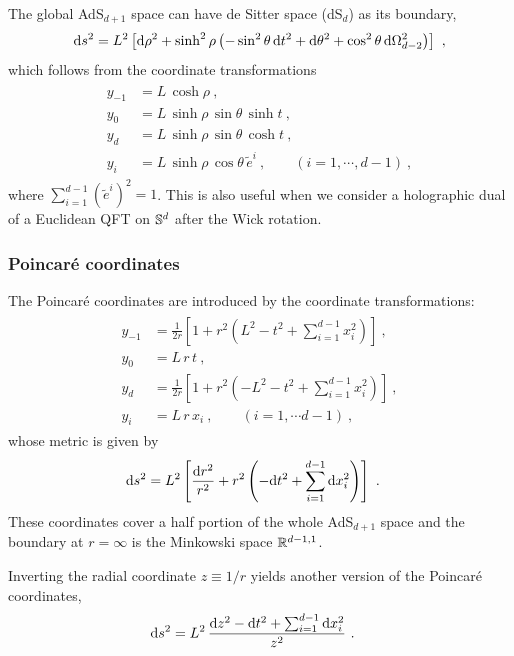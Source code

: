 The global AdS$_{d+1}$ space can have de Sitter space (dS$_{d}$) as its boundary,
\begin{align}
\mathrm{d} s^2 = L^2 \left[ \mathrm{d}\rho^2 + \sinh^2\rho \left( -\sin^2\theta\, \mathrm{d} t^2 + \mathrm{d}\theta^2 + \cos^2\theta \,\mathrm{d}\Omega_{d-2}^2 \right)\right] \ ,
\end{align}
which follows from the coordinate transformations
\begin{align}
\begin{aligned}
y_{-1} &= L\,\cosh\rho \ , \\
y_0 &= L\,\sinh\rho\, \sin\theta\, \sinh t \ , \\
y_d &= L\,\sinh\rho\, \sin\theta\, \cosh t \ , \\
y_i &= L\,\sinh \rho\, \cos\theta\,  \tilde e^i \ , \qquad (i=1,\cdots, d-1) \ , 
\end{aligned}
\end{align}
where $\sum_{i=1}^{d-1}(\tilde e^i)^2 = 1$.
This is also useful when we consider a holographic dual of a Euclidean QFT on $\mathbb{S}^d$ after the Wick rotation.


\subsubsection{Poincar{\'e} coordinates}
The Poincar{\'e} coordinates are introduced by the coordinate transformations:
\begin{align}
\begin{aligned}
y_{-1} &= \frac{1}{2r}\left[ 1 + r^2\left(L^2 -t^2 + \sum_{i=1}^{d-1}x_i^2\right)\right] \ , \\
y_0 &= L \,r\, t\ ,\\
y_d &= \frac{1}{2r}\left[ 1 + r^2\left(-L^2 -t^2 + \sum_{i=1}^{d-1}x_i^2\right)\right]  \ , \\
y_i &= L\, r\, x_i\ , \qquad (i=1,\cdots d-1) \ ,
\end{aligned}
\end{align}
whose metric is given by
\begin{align}
 \mathrm{d} s^2&=L^2\left[ \frac{\mathrm{d} r^2}{r^2} + r^2\left(-\mathrm{d} t^2 + \sum_{i=1}^{d-1} \mathrm{d} x_i^2 \right) \right] \ .
\end{align}
These coordinates cover a half portion of the whole AdS$_{d+1}$ space and the boundary at $r=\infty$ is the Minkowski space $\mathbb{R}^{d-1,1}$.

Inverting the radial coordinate $z\equiv 1/r$ yields another version of the Poincar{\'e} coordinates,
\begin{align}\label{AdS_Poincare_z}
 \mathrm{d} s^2&= L^2\,\frac{\mathrm{d} z^2 - \mathrm{d} t^2 + \sum_{i=1}^{d-1} \mathrm{d} x_i^2}{z^2} \ .
\end{align}



